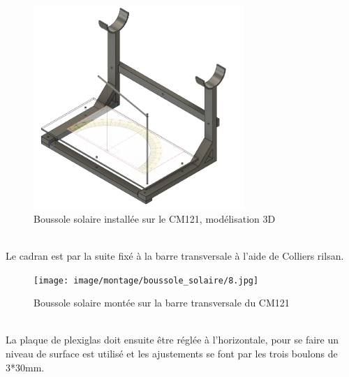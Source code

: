 \documentclass[12pt,a4paper]{article}
\begin{document}
\begin{flushleft}
 \begin{figure}[H]
\centering
\includegraphics[width=8cm]{image/montage/boussole_solaire/1.png} 
\caption{Boussole solaire installée sur le CM121, modélisation 3D}  
\end{figure}
~\\
Le cadran est par la suite fixé à la barre transversale à l'aide de Colliers rilsan.

 \begin{figure}[H]
\centering
\texttt{[image: image/montage/boussole\_solaire/8.jpg]} 
\caption{Boussole solaire montée sur la barre transversale du CM121 }  
\end{figure}
~\\
La plaque de plexiglas doit ensuite être réglée à l'horizontale, pour se faire un niveau de surface est utilisé et les ajustements se font par les trois boulons de 3*30mm.



\end{flushleft}
\end{document}
